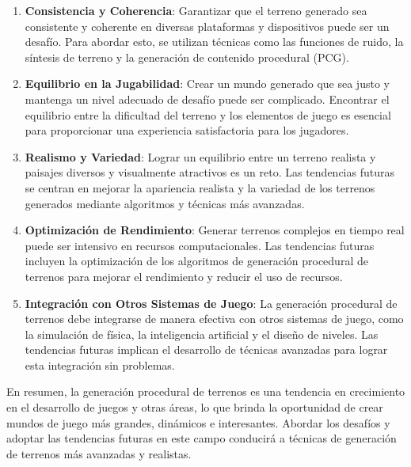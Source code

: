 \begin{enumerate}
    \item \textbf{Consistencia y Coherencia}: Garantizar que el terreno generado sea consistente y coherente en diversas plataformas y dispositivos puede ser un desafío. Para abordar esto, se utilizan técnicas como las funciones de ruido, la síntesis de terreno y la generación de contenido procedural (PCG)\cite{ConsistencyCoherence}.
    
    \item \textbf{Equilibrio en la Jugabilidad}: Crear un mundo generado que sea justo y mantenga un nivel adecuado de desafío puede ser complicado. Encontrar el equilibrio entre la dificultad del terreno y los elementos de juego es esencial para proporcionar una experiencia satisfactoria para los jugadores\cite{BalancingGameplay}.
    
    \item \textbf{Realismo y Variedad}: Lograr un equilibrio entre un terreno realista y paisajes diversos y visualmente atractivos es un reto. Las tendencias futuras se centran en mejorar la apariencia realista y la variedad de los terrenos generados mediante algoritmos y técnicas más avanzadas\cite{RealismVariety}.
    
    \item \textbf{Optimización de Rendimiento}: Generar terrenos complejos en tiempo real puede ser intensivo en recursos computacionales. Las tendencias futuras incluyen la optimización de los algoritmos de generación procedural de terrenos para mejorar el rendimiento y reducir el uso de recursos\cite{PerformanceOptimization}.
    
    \item \textbf{Integración con Otros Sistemas de Juego}: La generación procedural de terrenos debe integrarse de manera efectiva con otros sistemas de juego, como la simulación de física, la inteligencia artificial y el diseño de niveles. Las tendencias futuras implican el desarrollo de técnicas avanzadas para lograr esta integración sin problemas\cite{IntegrationWithGameSystems}.
\end{enumerate}

En resumen, la generación procedural de terrenos es una tendencia en crecimiento en el desarrollo de juegos y otras áreas, lo que brinda la oportunidad de crear mundos de juego más grandes, dinámicos e interesantes. Abordar los desafíos y adoptar las tendencias futuras en este campo conducirá a técnicas de generación de terrenos más avanzadas y realistas.
